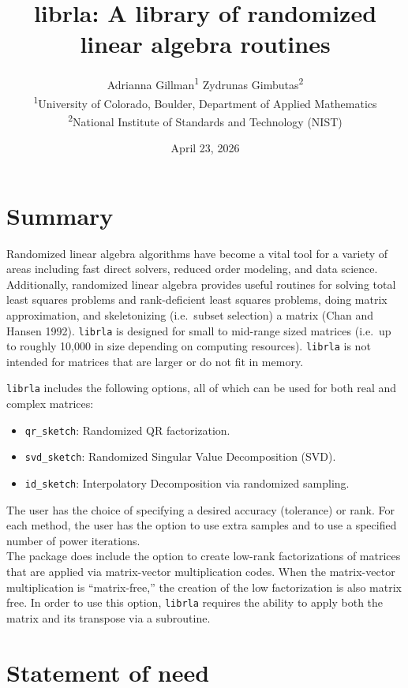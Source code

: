 \documentclass[
  12pt,
]{article}
\title{librla: A library of randomized linear algebra routines}
\author{Adrianna Gillman\textsuperscript{1} \quad Zydrunas Gimbutas\textsuperscript{2} \\[6pt]
\small \textsuperscript{1}University of Colorado, Boulder, Department of Applied Mathematics \\
\small \textsuperscript{2}National Institute of Standards and Technology (NIST)}
\date{April 23, 2026}
\providecommand{\tightlist}{%
  \setlength{\itemsep}{0pt}\setlength{\parskip}{0pt}}
\begin{document}
\maketitle

\section{Summary}\label{summary}

Randomized linear algebra algorithms have become a vital tool for a
variety of areas including fast direct solvers, reduced order modeling,
and data science. Additionally, randomized linear algebra provides
useful routines for solving total least squares problems and
rank-deficient least squares problems, doing matrix approximation, and
skeletonizing (i.e.~subset selection) a matrix (Chan and Hansen 1992).
\texttt{librla} is designed for small to mid-range sized matrices
(i.e.~up to roughly 10,000 in size depending on computing resources).
\texttt{librla} is not intended for matrices that are larger or do not
fit in memory.

\texttt{librla} includes the following options, all of which can be used
for both real and complex matrices:

\begin{itemize}
\tightlist
\item
  \texttt{qr\_sketch}: Randomized QR factorization.
\item
  \texttt{svd\_sketch}: Randomized Singular Value Decomposition (SVD).
\item
  \texttt{id\_sketch}: Interpolatory Decomposition via randomized
  sampling.
\end{itemize}

The user has the choice of specifying a desired accuracy (tolerance) or
rank. For each method, the user has the option to use extra samples and
to use a specified number of power iterations.\\
The package does include the option to create low-rank factorizations of
matrices that are applied via matrix-vector multiplication codes. When
the matrix-vector multiplication is ``matrix-free,'' the creation of the
low factorization is also matrix free. In order to use this option,
\texttt{librla} requires the ability to apply both the matrix and its
transpose via a subroutine.

\section{Statement of need}\label{statement-of-need}
\end{document}
